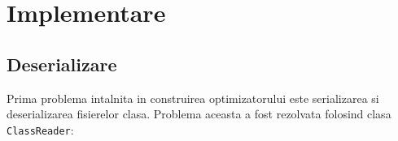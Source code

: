\chapter{Implementare}

\section{Deserializare}\label{deserializare}

Prima problema intalnita in construirea optimizatorului este
serializarea si deserializarea fisierelor clasa. Problema aceasta
a fost rezolvata folosind clasa \texttt{ClassReader}:



